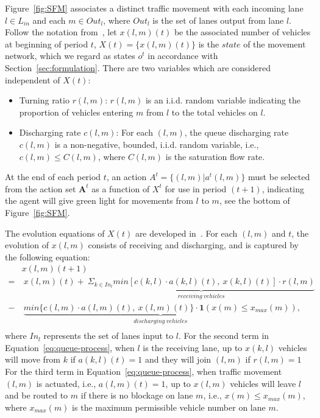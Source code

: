 \begin{example}
\label{eg:inter}
Figure~\ref{fig:SFM} associates a distinct traffic movement with each incoming lane $l\in L_{in}$ and each $m\in Out_l$, where $Out_l$ is the set of lanes output from lane $l$. 
Follow the notation from~\cite{MP13book}, let $x(l,m)(t)$ be the associated number of vehicles at beginning of period $t$, $X(t) = \{x(l,m)(t)\}$ is the $state$ of the movement network, which we regard as states $o^t$ in accordance with Section~\ref{sec:formulation}. There are two variables which are considered independent of $X(t)$: 
\begin{itemize}[wide,noitemsep,topsep=0pt]
    \item Turning ratio $r(l,m)$: $r(l,m)$ is an i.i.d. random variable indicating the proportion of vehicles entering $m$ from $l$ to the total vehicles on $l$. 
    
    \item Discharging rate $c(l,m)$: For each $(l,m)$, the queue discharging rate $c(l,m)$ is a non-negative, bounded, i.i.d. random variable,  i.e., $c(l,m)\leq C(l,m)$, where $C(l,m)$ is the saturation flow rate.
    
\end{itemize}

At the end of each period $t$, an action $A^t=\{(l,m)|a^t(l,m)\}$ must be selected from the action set $\pmb{A}^t$ as a function of $X^t$ for use in period $(t+1)$, indicating the agent will give green light for movements from $l$ to $m$, see the bottom of Figure~\ref{fig:SFM}. 

\end{example}

 The evolution equations of $X(t)$ are developed in~\cite{MP13}. For each $(l,m)$ and $t$, the evolution of $x(l,m)$ consists of receiving and discharging, and is captured by the following equation:
\begin{equation}
\begin{split}
\label{eq:queue-process}
      & x(l,m)(t+1) \\
    = &\ x(l,m)(t) + \ \underbrace{ \Sigma_{k\in In_l} min[c(k,l)\cdot a(k,l)(t),\ x(k,l)(t)]\cdot r(l,m)}_{receiving\ vehicles}\\
    - &\ \underbrace{ min\{c(l,m)\cdot a(l,m)(t),\ x(l,m)(t)\}\cdot \mathbf{1}(x(m)\le x_{max}(m))}_{discharging\ vehicles},\\
\end{split}
\end{equation}
where $In_l$ represents the set of lanes input to $l$. For the second term in Equation~\eqref{eq:queue-process}, when $l$ is the receiving lane, up to $x(k,l)$ vehicles will move from $k$ if $a(k,l)(t)=1$ and they will join $(l,m)$ if $r(l,m)=1$
For the third term in Equation~\eqref{eq:queue-process}, when traffic movement $(l,m)$ is actuated, i.e., $a(l,m)(t)=1$, up to $x(l,m)$ vehicles will leave $l$ and be routed to $m$ if there is no blockage on lane $m$, i.e., $x(m)\leq x_{max}(m)$, where $x_{max}(m)$ is the maximum permissible vehicle number on lane $m$. 

